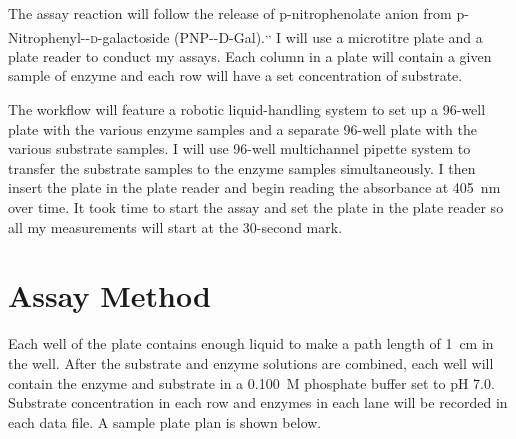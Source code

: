 \documentclass[]{tufte-handout}
\begin{document}
The assay reaction will follow the release of p-nitrophenolate anion from p-Nitrophenyl-\textbeta -\textsc{d}-galactoside (PNP-\textbeta-D-Gal).\textsuperscript{,}\textsuperscript{,} I will use a microtitre plate and a plate reader to conduct my assays. Each column in a plate will contain a given sample of enzyme and each row will have a set concentration of substrate.

The workflow will feature a robotic liquid-handling system to set up a 96-well plate with the various enzyme samples and a separate 96-well plate with the various substrate samples. I will use  96-well multichannel pipette system to transfer the substrate samples to the enzyme samples simultaneously. I then insert the plate in the plate reader and begin reading the absorbance at \qty{405}{nm} over time. It took time to start the assay and set the plate in the plate reader so all my measurements will start at the 30-second mark. 

\section{Assay Method}

Each well of the plate contains enough liquid to make a path length of \qty{1}{cm} in the well. After the substrate and enzyme solutions are combined, each well will contain the enzyme and substrate in a \qty{0.100}{M} phosphate buffer set to pH 7.0. Substrate concentration in each row and enzymes in each lane will be recorded in each data file. A sample plate plan is shown below.
\end{document}
